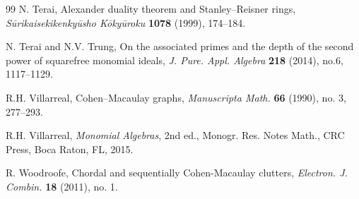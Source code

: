 \documentclass[12pt]{amsart}
\theoremstyle{definition}
\theoremstyle{remark}
\begin{document}
\begin{thebibliography}{99}
 N. Terai,
Alexander duality theorem and Stanley--Reisner rings,
{\it S\=urikaisekikenky\=usho K\=oky\=uroku}
{\bf 1078} (1999), 174--184.

 N. Terai and N.V. Trung, 
On the associated primes and the depth of the second power of squarefree monomial ideals, 
{\it J. Pure. Appl. Algebra} {\bf 218} (2014), no.6, 1117--1129. 

 R.H. Villarreal, 
Cohen--Macaulay graphs, 
\textit{Manuscripta Math.} \textbf{66} (1990), no. 3, 277--293.

 R.H. Villarreal,
{\it Monomial Algebras}, 2nd ed.,
Monogr. Res. Notes Math., CRC Press, Boca Raton, FL, 2015.

 R. Woodroofe, 
Chordal and sequentially Cohen-Macaulay clutters, 
{\it Electron. J. Combin.} {\bf 18} (2011), no. 1. 

\end{thebibliography}

\end{document}
